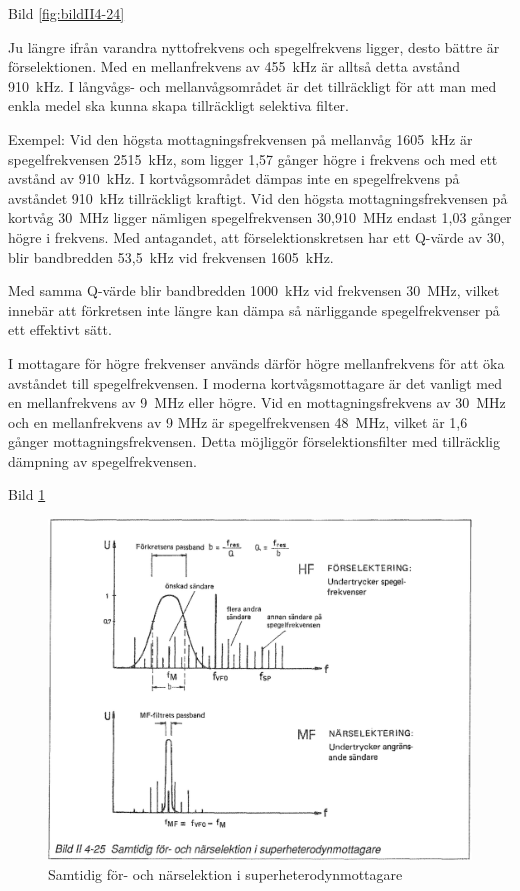 Bild \ref{fig:bildII4-24}

Ju längre ifrån varandra nyttofrekvens och spegelfrekvens ligger,
desto bättre är förselektionen. Med en mellanfrekvens av 455~kHz är
alltså detta avstånd 910~kHz. I långvågs- och mellanvågsområdet är det
tillräckligt för att man med enkla medel ska kunna skapa
tillräckligt selektiva filter.

Exempel: Vid den högsta mottagningsfrekvensen på mellanvåg 1605~kHz är
spegelfrekvensen 2515~kHz, som ligger 1,57 gånger högre i frekvens och
med ett avstånd av 910~kHz. I kortvågsområdet dämpas inte en
spegelfrekvens på avståndet 910~kHz tillräckligt kraftigt. Vid den
högsta mottagningsfrekvensen på kortvåg 30~MHz ligger nämligen
spegelfrekvensen 30,910~MHz endast 1,03 gånger högre i frekvens. Med
antagandet, att förselektionskretsen har ett Q-värde av 30, blir
bandbredden 53,5~kHz vid frekvensen 1605~kHz.

Med samma Q-värde blir bandbredden 1000~kHz vid frekvensen 30~MHz,
vilket innebär att förkretsen inte längre kan dämpa så närliggande
spegelfrekvenser på ett effektivt sätt.

I mottagare för högre frekvenser används därför högre mellanfrekvens
för att öka avståndet till spegelfrekvensen. I moderna
kortvågsmottagare är det vanligt med en mellanfrekvens av 9~MHz eller
högre. Vid en mottagningsfrekvens av 30~MHz och en mellanfrekvens av 9
MHz är spegelfrekvensen 48~MHz, vilket är 1,6 gånger
mottagningsfrekvensen. Detta möjliggör förselektionsfilter med
tillräcklig dämpning av spegelfrekvensen.

Bild \ref{fig:bildII4-25}

\begin{figure}
  \includegraphics[width=\textwidth]{images/bild_2_4-25}
  \caption{Samtidig för- och närselektion i superheterodynmottagare}
  \label{fig:bildII4-25}
\end{figure}

